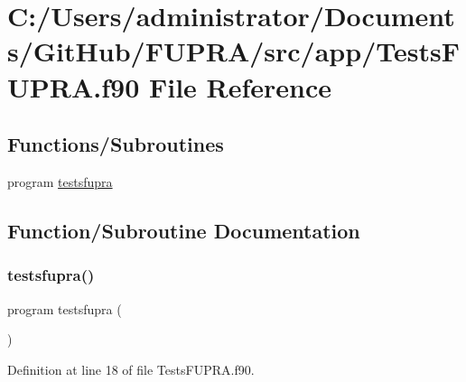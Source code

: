 \hypertarget{_tests_f_u_p_r_a_8f90}{}\section{C\+:/\+Users/administrator/\+Documents/\+Git\+Hub/\+F\+U\+P\+R\+A/src/app/\+Tests\+F\+U\+P\+RA.f90 File Reference}
\label{_tests_f_u_p_r_a_8f90}
\subsection*{Functions/\+Subroutines}
\begin{DoxyCompactItemize}
\item 
program \mbox{\hyperlink{_tests_f_u_p_r_a_8f90_af6d00829ed91102291ffd1199052a1f4}{testsfupra}}
\end{DoxyCompactItemize}


\subsection{Function/\+Subroutine Documentation}
\mbox{\label{_tests_f_u_p_r_a_8f90_af6d00829ed91102291ffd1199052a1f4}} 
\subsubsection{\texorpdfstring{testsfupra()}{testsfupra()}}
{\footnotesize\ttfamily program testsfupra (\begin{DoxyParamCaption}{ }\end{DoxyParamCaption})}



Definition at line 18 of file Tests\+F\+U\+P\+R\+A.\+f90.

